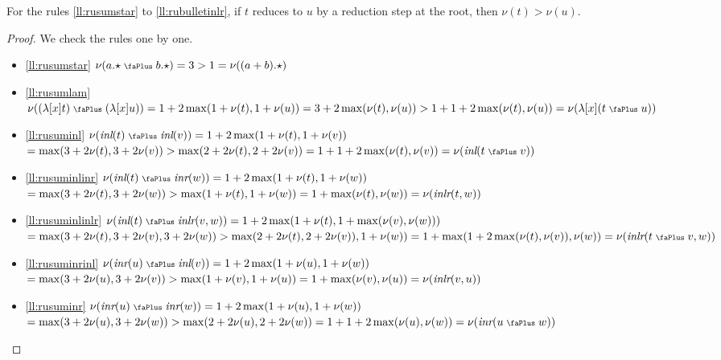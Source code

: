 \documentclass[screen, sigconf,authorversion,nonacm]{acmart}
\theoremstyle{acmdefinition}
\numberwithin{equation}{section}
\newcommand\abstr[1]{[#1]}
\newcommand\inl{\mbox{\it inl}}
\newcommand\inr{\mbox{\it inr}}
\newcommand\inlr{\mbox{\it inlr}}
\newcommand\plus{\mathrel{\text{\normalfont\scalebox{0.7}{\faPlus}}}}
\begin{document}
\begin{lemma}
  \label{lem:mured3}
  For the rules \eqref{ll:rusumstar} to \eqref{ll:rubulletinlr}, if $t$
  reduces to $u$ by a reduction step at the root, then $\nu(t) >
  \nu(u)$.
\end{lemma}
\begin{proof}
  We check the rules one by one.
  \begin{itemize}

    \item \eqref{ll:rusumstar} $\nu({a.\star} \plus b.\star) = 3 > 1 =
      \nu((a+b).\star)$

    \item \eqref{ll:rusumlam} $\nu((\lambda \abstr{x}t) \plus (\lambda
      \abstr{x}u)) = 1 + 2 \max(1 + \nu(t), 1 + \nu(u)) = 3 + 2
      \max(\nu(t),\nu(u)) > 1 + 1 + 2 \max(\nu(t),\nu(u)) = \nu(\lambda
      \abstr{x}(t \plus u))$

    \item \eqref{ll:rusuminl} $\nu(\inl(t) \plus \inl(v)) = 1 +2 \max (1 +
      \nu(t), 1 + \nu(v))$\\ $= \max (3 + 2 \nu(t), 3 + 2 \nu(v)) > \max
      (2 + 2 \nu(t), 2 + 2 \nu(v)) = 1 + 1 + 2 \max (\nu(t), \nu(v)) =
      \nu(\inl(t \plus v))$

    \item \eqref{ll:rusuminlinr} $\nu(\inl(t) \plus \inr(w)) = 1 +2 \max
      (1 + \nu(t), 1 + \nu(w))$\\ $ = \max (3 + 2 \nu(t), 3 + 2 \nu(w)) >
      \max (1 + \nu(t),1 + \nu(w)) = 1 + \max (\nu(t),\nu(w)) =
      \nu(\inlr(t,w))$

    \item \eqref{ll:rusuminlinlr} $\nu(\inl(t) \plus \inlr(v,w)) = 1 + 2
      \max (1 + \nu(t), 1 + \max(\nu(v),\nu(w)))$\\ $= \max (3 + 2
      \nu(t),3 + 2 \nu(v),3 + 2 \nu(w)) > \max(2 + 2 \nu(t), 2 + 2\nu(v)),
    1 + \nu(w)) = 1 + \max(1+ 2 \max(\nu(t),\nu(v)), \nu(w)) =
    \nu(\inlr(t \plus v,w))$

  \item \eqref{ll:rusuminrinl} $\nu(\inr(u) \plus \inl(v)) = 1 + 2 \max
    (1 + \nu(u), 1 + \nu(w))$\\ $ = \max(3 + 2 \nu(u),3 + 2 \nu(v)) >
    \max(1 + \nu(v), 1 + \nu(u)) = 1 + \max(\nu(v), \nu(u)) =
    \nu(\inlr(v,u))$

  \item \eqref{ll:rusuminr} $\nu(\inr(u) \plus \inr(w)) = 1 +2 \max (1 +
    \nu(u), 1 + \nu(w))$\\ $= \max (3 + 2 \nu(u), 3 + 2 \nu(w)) > \max
    (2 + 2 \nu(u), 2 + 2 \nu(w)) = 1 + 1 + 2 \max (\nu(u), \nu(w)) =
    \nu(\inr(u \plus w))$


\end{itemize}
\end{proof}
\end{document}
